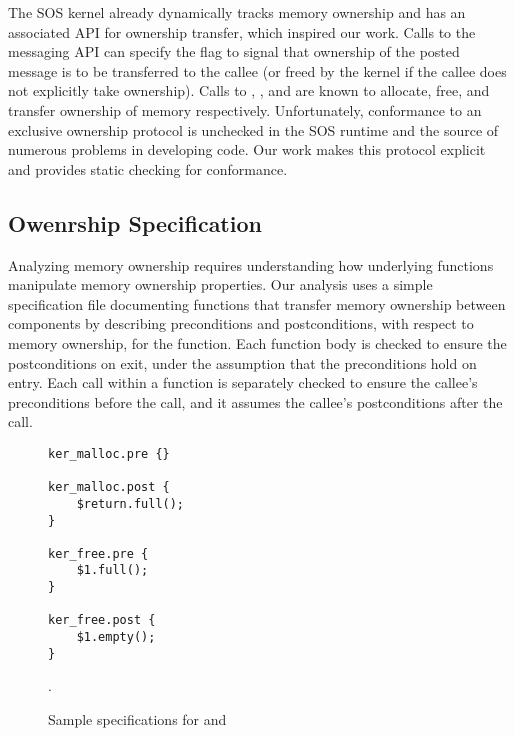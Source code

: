 The SOS kernel already dynamically tracks memory ownership and has an
associated API for ownership transfer, which inspired our work.  
%
Calls to the messaging API can specify the  flag to
signal that ownership of the posted message is to be transferred to the callee
(or freed by the kernel if the callee does not explicitly take ownership).  
%
Calls to , , and 
are known to allocate, free, and transfer ownership of memory respectively.
%
Unfortunately, conformance to an exclusive ownership protocol is unchecked in
the SOS runtime and the source of numerous problems in developing code.
%
Our work makes this protocol explicit and provides static checking for
conformance.



\subsection{Owenrship Specification}


%  
%  



Analyzing memory ownership requires understanding how underlying functions
manipulate memory ownership properties.
%
Our analysis uses a simple specification file documenting functions that
transfer memory ownership between components by describing preconditions and
postconditions, with respect to memory ownership, for the function.
%
Each function body is checked to ensure the postconditions on exit, under
the assumption that the preconditions hold on entry.  
%
Each call within a function is separately checked to ensure the callee's
preconditions before the call, and it assumes the callee's postconditions
after the call.



\begin{figure}[tp]
\begin{scriptsize}
\begin{verbatim}
ker_malloc.pre {}

ker_malloc.post {
    $return.full();
}

ker_free.pre {
    $1.full();
}

ker_free.post {
    $1.empty();
}
\end{verbatim}
\end{scriptsize}
\caption{\label{fig:spec}Sample specifications for  and
}.
\end{figure}



